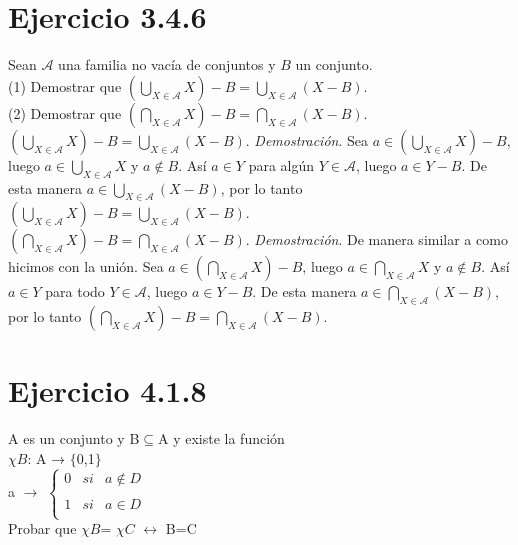 \documentclass{report}
\begin{document}
    \section{Ejercicio 3.4.6}
        Sean $\mathcal{A}$ una familia no vacía de conjuntos y $B$ un conjunto.\\
        (1) Demostrar que $\left(\bigcup_{X \in \mathcal{A}} X\right)-B=\bigcup_{X \in \mathcal{A}}(X-B)$.\\
        (2) Demostrar que $\left(\bigcap_{X \in \mathcal{A}} X\right)-B=\bigcap_{X \in \mathcal{A}}(X-B)$.\\

        \noindent $\left(\bigcup_{X \in \mathcal{A}} X\right)-B=\bigcup_{X \in \mathcal{A}}(X-B)$. \textit{Demostración}. Sea $a \in \left(\bigcup_{X \in \mathcal{A}} X\right)-B$, luego $a \in \bigcup_{X \in \mathcal{A}} X$ y $a \not \in B$. Así $a \in Y$ para algún $Y \in \mathcal{A}$, luego $a \in Y - B$. De esta manera $a \in \bigcup_{X \in \mathcal{A}}(X-B)$, por lo tanto $\left(\bigcup_{X \in \mathcal{A}} X\right)-B=\bigcup_{X \in \mathcal{A}}(X-B)$.\\

        \noindent $\left(\bigcap_{X \in \mathcal{A}} X\right)-B=\bigcap_{X \in \mathcal{A}}(X-B)$. \textit{Demostración}. De manera similar a como hicimos con la unión. Sea $a \in \left(\bigcap_{X \in \mathcal{A}} X\right)-B$, luego $a \in \bigcap_{X \in \mathcal{A}} X$ y $a \not \in B$. Así $a \in Y$ para todo $Y \in \mathcal{A}$, luego $a \in Y - B$. De esta manera $a \in \bigcap_{X \in \mathcal{A}}(X-B)$, por lo tanto $\left(\bigcap_{X \in \mathcal{A}} X\right)-B=\bigcap_{X \in \mathcal{A}}(X-B)$.

    \section{Ejercicio 4.1.8}

    A es un conjunto y B$\subseteq$A y existe la función \\$\chi B$: A → $\lbrace${0,1}$\rbrace$ \\a $\rightarrow$ $\left\{ \begin{array}{lcc}
        0 &   si &  a \notin D \\
        \\ 1 &  si & a \in D \\
        \end{array}
    \right.$\\

    Probar que $\chi B$= $\chi C$ $\leftrightarrow$ B=C\\
\end{document}
